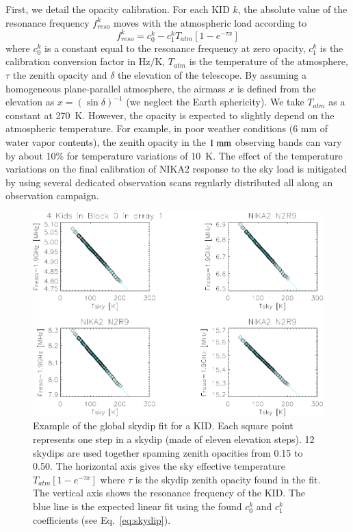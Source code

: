 First, we detail the opacity calibration. For each KID $k$, the
absolute value of the resonance frequency $f_{reso}^k$ moves with the
atmospheric load according to
%
\begin{equation}
f_{reso}^k  = c_0^k - c_1^k T_{atm}[1-e^{-\tau x}]
\label{eq:skydip}
\end{equation}
%
where $c_0^k$ is a constant equal to the resonance frequency at zero
opacity, $c_1^k$ is the calibration conversion factor in Hz$/$K,
$T_{atm}$ is the temperature of the atmosphere, $\tau$ the zenith
opacity and $\delta$ the elevation of the
telescope.  By assuming a homogeneous plane-parallel atmosphere, the
airmass $x$ is defined from the elevation as $x =
\left(\sin\delta\right)^{-1}$ (we neglect the Earth sphericity).
We take $T_{atm}$ as a constant at 270~K. However, the opacity is
expected to slightly depend on the atmospheric temperature. For
example, in poor weather conditions (6 mm of water vapor contents),
the zenith opacity in the $1~\rm{mm}$ observing bands can vary by
about 10\% for temperature variations of 10~K. The
effect of the temperature variations on the final
calibration of NIKA2 response to the sky load is mitigated by using
several dedicated observation scans regularly distributed all along an
observation campaign.
%
\begin{figure}[!htbp]
\begin{center}
\includegraphics[trim={9cm 0cm 0cm 6.5cm}, clip=true, width=0.9\linewidth]{Figures/test_allskd4_N2R9v5_5-crop.pdf}
\caption[]{Example of the global skydip fit for a KID.
Each square point represents one step in a skydip (made of eleven
elevation steps). 12 skydips are used together spanning zenith
opacities from 0.15 to 0.50. The horizontal axis gives the sky
effective temperature $T_{atm}[1-e^{-\tau x}]$ where $\tau$ is the
skydip zenith opacity found in the fit. The vertical axis shows the
resonance frequency of the KID. The blue line is the expected linear
fit using the found $c_0^k$ and $c_1^k$ coefficients (see
Eq.~\ref{eq:skydip}).}
\label{fig:skydipfitexample}
\end{center}
\end{figure}

